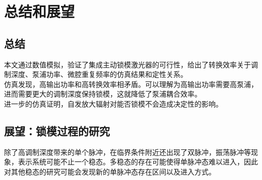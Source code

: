 \chapter{总结和展望}

\fontsize{12bp}{14.4pt}

\section{总结}
本文通过数值模拟，验证了集成主动锁模激光器的可行性，给出了转换效率关于调制深度、泵浦功率、微腔重复频率的仿真结果和定性关系。\\
仿真发现，高输出功率和高转换效率相矛盾。可以理解为高输出功率需要高泵浦，进而需要更大的调制深度保持锁模，这就降低了泵浦耦合效率。\\
进一步的仿真证明，自发放大辐射对能否锁模不会造成决定性的影响。
\section{展望：锁模过程的研究}
除了高调制深度带来的单个脉冲，在临界条件附近还出现了双脉冲，振荡脉冲等现象，表示系统可能不止一个稳态。多稳态的存在可能使得单脉冲态难以进入，因此对其他稳态的研究可能会发现新的单脉冲态存在区间以及进入方式。

